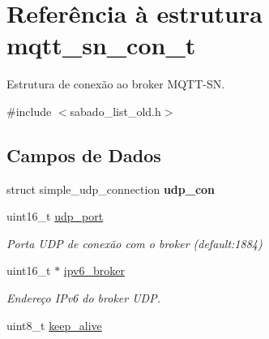 \hypertarget{structmqtt__sn__con__t}{\section{Referência à estrutura mqtt\+\_\+sn\+\_\+con\+\_\+t}
\label{structmqtt__sn__con__t}
}


Estrutura de conexão ao broker M\+Q\+T\+T-\/\+S\+N.  




{\ttfamily \#include $<$sabado\+\_\+list\+\_\+old.\+h$>$}

\subsection*{Campos de Dados}
\begin{DoxyCompactItemize}
\item 
\hypertarget{structmqtt__sn__con__t_a60158486bd2056b682241cd713f462ac}{struct simple\+\_\+udp\+\_\+connection {\bfseries udp\+\_\+con}}\label{structmqtt__sn__con__t_a60158486bd2056b682241cd713f462ac}

\item 
\hypertarget{structmqtt__sn__con__t_a8d93540b1ceafa3f9425c72763b256d0}{uint16\+\_\+t \hyperlink{structmqtt__sn__con__t_a8d93540b1ceafa3f9425c72763b256d0}{udp\+\_\+port}}\label{structmqtt__sn__con__t_a8d93540b1ceafa3f9425c72763b256d0}

\begin{DoxyCompactList}\small\item\em Porta U\+D\+P de conexão com o broker (default\+:1884) \end{DoxyCompactList}\item 
\hypertarget{structmqtt__sn__con__t_aedc2daa18c79a13bef1abb9f6a2a24f8}{uint16\+\_\+t $\ast$ \hyperlink{structmqtt__sn__con__t_aedc2daa18c79a13bef1abb9f6a2a24f8}{ipv6\+\_\+broker}}\label{structmqtt__sn__con__t_aedc2daa18c79a13bef1abb9f6a2a24f8}

\begin{DoxyCompactList}\small\item\em Endereço I\+Pv6 do broker U\+D\+P. \end{DoxyCompactList}\item 
\hypertarget{structmqtt__sn__con__t_a3750af18bf5708bce3c563c0c160e712}{uint8\+\_\+t \hyperlink{structmqtt__sn__con__t_a3750af18bf5708bce3c563c0c160e712}{keep\+\_\+alive}}\label{structmqtt__sn__con__t_a3750af18bf5708bce3c563c0c160e712}


\end{DoxyCompactItemize}
